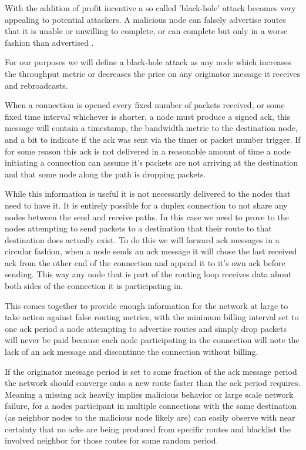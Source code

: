 \documentclass[11pt]{article}
\begin{document}
               With the addition of profit incentive a so called 'black-hole' attack becomes very appealing to potential attackers. A malicious node can falsely advertise routes that it is unable or unwilling to complete, or can complete but only in a worse fashion than advertised \cite{routesec}. 
               
               For our purposes we will define a black-hole attack as any node which increases the throughput metric or decreases the price on any originator message it receives and rebroadcasts.

               When a connection is opened every fixed number of packets received, or some fixed time interval whichever is shorter, a node must produce a signed ack, this message will contain a timestamp, the bandwidth metric to the destination node, and a bit to indicate if the ack was sent via the timer or packet number trigger. If for some reason this ack is not delivered in a reasonable amount of time a node initiating a connection can assume it's packets are not arriving at the destination and that some node along the path is dropping packets.
               
               While this information is useful it is not necessarily delivered to the nodes that need to have it. It is entirely possible for a duplex connection to not share any nodes between the send and receive paths. In this case we need to prove to the nodes attempting to send packets to a destination that their route to that destination does actually exist. To do this we will forward ack messages in a circular fashion, when a node sends an ack message it will chose the last received ack from the other end of the connection and append it to it's own ack before sending. This way any node that is part of the routing loop receives data about both sides of the connection it is participating in.
               
               This comes together to provide enough information for the network at large to take action against false routing metrics, with the minimum billing interval set to one ack period a node attempting to advertise routes and simply drop packets will never be paid because each node participating in the connection will note the lack of an ack message and discontinue the connection without billing.
               
               If the originator message period is set to some fraction of the ack message period the network should converge onto a new route faster than the ack period requires. Meaning a missing ack heavily implies malicious behavior or large scale network failure, for a nodes participant in multiple connections with the same destination (as neighbor nodes to the malicious node likely are) can easily observe with near certainty that no acks are being produced from specific routes and blacklist the involved neighbor for those routes for some random period.
               
\end{document}
